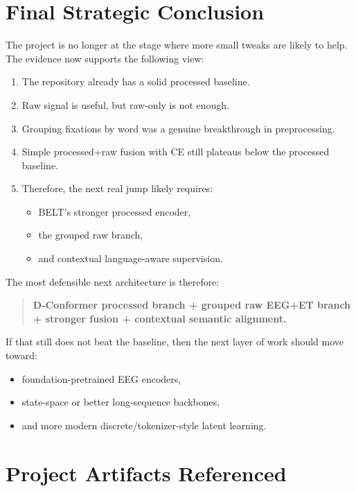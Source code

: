 \documentclass[11pt]{article}
\begin{document}
\section{Final Strategic Conclusion}

The project is no longer at the stage where more small tweaks are likely to help. The evidence now supports the following view:

\begin{enumerate}
    \item The repository already has a solid processed baseline.
    \item Raw signal is useful, but raw-only is not enough.
    \item Grouping fixations by word was a genuine breakthrough in preprocessing.
    \item Simple processed+raw fusion with CE still plateaus below the processed baseline.
    \item Therefore, the next real jump likely requires:
    \begin{itemize}
        \item BELT's stronger processed encoder,
        \item the grouped raw branch,
        \item and contextual language-aware supervision.
    \end{itemize}
\end{enumerate}

The most defensible next architecture is therefore:
\begin{quote}
\textbf{D-Conformer processed branch + grouped raw EEG+ET branch + stronger fusion + contextual semantic alignment.}
\end{quote}

If that still does not beat the baseline, then the next layer of work should move toward:
\begin{itemize}
    \item foundation-pretrained EEG encoders,
    \item state-space or better long-sequence backbones,
    \item and more modern discrete/tokenizer-style latent learning.
\end{itemize}

\section*{Project Artifacts Referenced}
\end{document}

